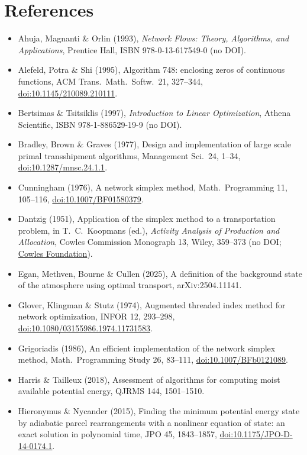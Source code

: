 \documentclass[11pt,a4paper]{article}
\newcommand{\doi}[1]{\href{https://doi.org/#1}{doi:#1}}
\begin{document}
\section*{References}
\begin{itemize}\small
  \item Ahuja, Magnanti \& Orlin (1993), \emph{Network Flows: Theory, Algorithms, and Applications}, Prentice Hall,
        ISBN 978-0-13-617549-0 (no DOI).
  \item Alefeld, Potra \& Shi (1995), Algorithm 748: enclosing zeros of continuous functions, ACM Trans.\ Math.\ Softw.\ 21,
        327--344, \doi{10.1145/210089.210111}.
  \item Bertsimas \& Tsitsiklis (1997), \emph{Introduction to Linear Optimization}, Athena Scientific, ISBN 978-1-886529-19-9
        (no DOI).
  \item Bradley, Brown \& Graves (1977), Design and implementation of large scale primal transshipment algorithms,
        Management Sci.\ 24, 1--34, \doi{10.1287/mnsc.24.1.1}.
  \item Cunningham (1976), A network simplex method, Math.\ Programming 11, 105--116, \doi{10.1007/BF01580379}.
  \item Dantzig (1951), Application of the simplex method to a transportation problem, in T.\ C.\ Koopmans (ed.),
        \emph{Activity Analysis of Production and Allocation}, Cowles Commission Monograph 13, Wiley, 359--373 (no DOI;
        \href{https://cowles.yale.edu/research/cfm-13-activity-analysis-production-and-allocation}{Cowles Foundation}).
  \item Egan, Methven, Bourne \& Cullen (2025), A definition of the background state of the atmosphere using optimal
        transport, arXiv:2504.11141.
  \item Glover, Klingman \& Stutz (1974), Augmented threaded index method for network optimization, INFOR 12, 293--298,
        \doi{10.1080/03155986.1974.11731583}.
  \item Grigoriadis (1986), An efficient implementation of the network simplex method, Math.\ Programming Study 26, 83--111,
        \doi{10.1007/BFb0121089}.
  \item Harris \& Tailleux (2018), Assessment of algorithms for computing moist available potential energy, QJRMS 144, 1501--1510.
  \item Hieronymus \& Nycander (2015), Finding the minimum potential energy state by adiabatic parcel rearrangements with a
        nonlinear equation of state: an exact solution in polynomial time, JPO 45, 1843--1857, \doi{10.1175/JPO-D-14-0174.1}.

\end{itemize}
\end{document}
